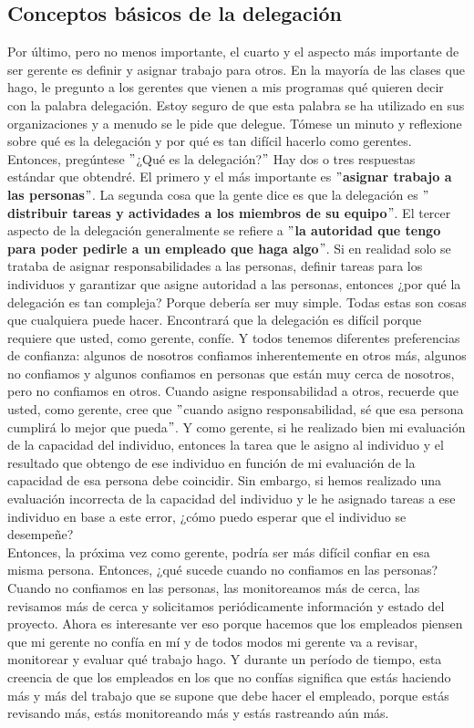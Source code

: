 \documentclass[10pt]{book}
\begin{document}
\subsection{Conceptos básicos de la delegación}
Por último, pero no menos importante, el cuarto y el aspecto más importante de ser gerente es definir y asignar trabajo para otros. En la mayoría de las clases que hago, le pregunto a los gerentes que vienen a mis programas qué quieren decir con la palabra delegación. Estoy seguro de que esta palabra se ha utilizado en sus organizaciones y a menudo se le pide que delegue. Tómese un minuto y reflexione sobre qué es la delegación y por qué es tan difícil hacerlo como gerentes. Entonces, pregúntese $"$¿Qué es la delegación?$"$ Hay dos o tres respuestas estándar que obtendré. El primero y el más importante es \textbf{$"$asignar trabajo a las personas$"$}. La segunda cosa que la gente dice es que la delegación es \textbf{$"$distribuir tareas y actividades a los miembros de su equipo$"$}. El tercer aspecto de la delegación generalmente se refiere a \textbf{$"$la autoridad que tengo para poder pedirle a un empleado que haga algo$"$}. Si en realidad solo se trataba de asignar responsabilidades a las personas, definir tareas para los individuos y garantizar que asigne autoridad a las personas, entonces ¿por qué la delegación es tan compleja? Porque debería ser muy simple. Todas estas son cosas que cualquiera puede hacer. Encontrará que la delegación es difícil porque requiere que usted, como gerente, confíe. Y todos tenemos diferentes preferencias de confianza: algunos de nosotros confiamos inherentemente en otros más, algunos no confiamos y algunos confiamos en personas que están muy cerca de nosotros, pero no confiamos en otros. Cuando asigne responsabilidad a otros, recuerde que usted, como gerente, cree que $"$cuando asigno responsabilidad, sé que esa persona cumplirá lo mejor que pueda$"$. Y como gerente, si he realizado bien mi evaluación de la capacidad del individuo, entonces la tarea que le asigno al individuo y el resultado que obtengo de ese individuo en función de mi evaluación de la capacidad de esa persona debe coincidir. Sin embargo, si hemos realizado una evaluación incorrecta de la capacidad del individuo y le he asignado tareas a ese individuo en base a este error, ¿cómo puedo esperar que el individuo se desempeñe?\\
Entonces, la próxima vez como gerente, podría ser más difícil confiar en esa misma persona. Entonces, ¿qué sucede cuando no confiamos en las personas? Cuando no confiamos en las personas, las monitoreamos más de cerca, las revisamos más de cerca y solicitamos periódicamente información y estado del proyecto. Ahora es interesante ver eso porque hacemos que los empleados piensen que mi gerente no confía en mí y de todos modos mi gerente va a revisar, monitorear y evaluar qué trabajo hago. Y durante un período de tiempo, esta creencia de que los empleados en los que no confías significa que estás haciendo más y más del trabajo que se supone que debe hacer el empleado, porque estás revisando más, estás monitoreando más y estás rastreando aún más.\\
\end{document}
